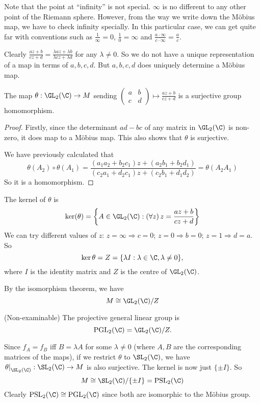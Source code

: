 \documentclass[a4paper]{article}
\begin{document}
Note that the point at ``infinity'' is not special. $\infty$ is no different to any other point of the Riemann sphere. However, from the way we write down the M\"obius map, we have to check infinity specially. In this particular case, we can get quite far with conventions such as $\frac{1}{\infty} = 0$, $\frac{1}{0} = \infty$ and $\frac{a\cdot \infty}{c\cdot \infty} = \frac{a}{c}$.

Clearly $\frac{az + b}{cz + d} = \frac{\lambda az + \lambda b}{\lambda cz + \lambda d}$ for any $\lambda \not= 0$. So we do not have a unique representation of a map in terms of $a, b, c, d$. But $a, b, c, d$ does uniquely determine a M\"obius map.

\begin{prop}
  The map $\theta: \GL_2(\C)\to M$ sending $
  \displaystyle \begin{pmatrix}
    a & b\\
    c & d
  \end{pmatrix} \mapsto \frac{az + b}{cz + d}$ is a surjective group homomorphism.
\end{prop}

\begin{proof}
  Firstly, since the determinant $ad - bc$ of any matrix in $\GL_2(\C)$ is non-zero, it does map to a M\"obius map. This also shows that $\theta$ is surjective.

  We have previously calculated that
  \[
    \theta(A_2)\circ \theta(A_1) = \frac{(a_1a_2 + b_2c_1)z + (a_2b_1 + b_2d_1)}{(c_2a_1 + d_2c_1)z + (c_2b_1 + d_1d_2)} = \theta(A_2A_1)
  \]
  So it is a homomorphism.
\end{proof}

The kernel of $\theta$ is
\[
  \ker(\theta) = \left\{A\in \GL_2(\C): (\forall z)\,z = \frac{az + b}{cz + d}\right\}
\]
We can try different values of $z$: $z = \infty \Rightarrow c = 0$; $z = 0 \Rightarrow b = 0$; $z = 1\Rightarrow d = a$. So
\[
  \ker\theta = Z = \{\lambda I: \lambda \in \C, \lambda\not= 0\},
\]
where $I$ is the identity matrix and $Z$ is the centre of $\GL_2(\C)$.

By the isomorphism theorem, we have
\[
  M \cong \GL_2(\C)/Z
\]

\begin{defi}
  (Non-examinable) The projective general linear group is
  \[
    \mathrm{PGL}_2(\C) = \GL_2(\C)/Z.
  \]
\end{defi}
Since $f_A = f_B$ iff $B = \lambda A$ for some $\lambda\not= 0$ (where $A, B$ are the corresponding matrices of the maps), if we restrict $\theta$ to $\SL_2(\C)$, we have $\left.\theta\right|_{\SL_2(\C)}: \SL_2(\C)\to M$ is also surjective. The kernel is now just $\{\pm I\}$. So
\[
  M \cong \SL_2(\C)/\{\pm I\} = \mathrm{PSL_2}(\C)
\]
Clearly $\mathrm{PSL}_2(\C)\cong \mathrm{PGL}_2(\C)$ since both are isomorphic to the M\"obius group.
\end{document}
